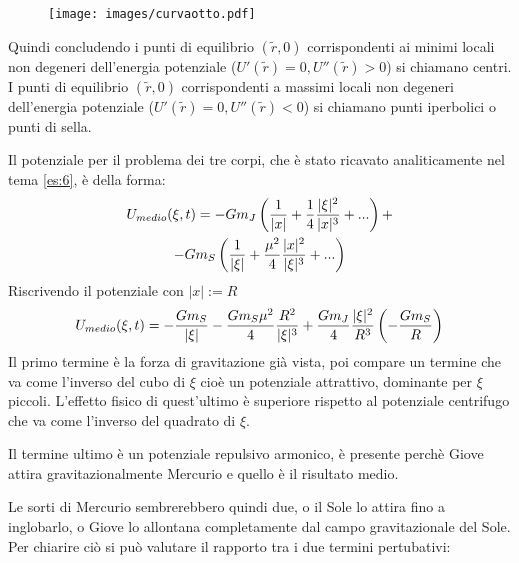 \documentclass[Main.tex]{subfiles}
\begin{document}
\begin{figure}[H]
    \centering
    \texttt{[image: images/curvaotto.pdf]}
\end{figure}

Quindi concludendo i punti di equilibrio $(\tilde r ,0)$ corrispondenti ai minimi locali non degeneri dell'energia potenziale ($U'( \tilde r) = 0 , U'' (\tilde r) >0$) si chiamano centri.
\\ I punti di equilibrio $(\tilde r ,0)$ corrispondenti a massimi locali non degeneri dell'energia potenziale ($U'(\tilde r)=0, U''(\tilde r) <0$) si chiamano punti iperbolici o punti di sella.

\newpage
\begin{tema} 
Il potenziale per il problema dei tre corpi, che è stato ricavato analiticamente nel tema \ref{es:6}, è della forma:
\begin{gather} \notag
	U_{medio} ( \xi, t) = - Gm_J \left( \frac{1}{|x|} + \frac{1}{4} \frac{|\xi|^2}{|x|^3} + ... \right)+ \\-Gm_S \left( \frac{1}{|\xi|} + \frac{\mu^2}{4} \frac{|x|^2}{|\xi|^3} +...\right) \notag
\end{gather}
Riscrivendo il potenziale con $|x|:=R$
\begin{equation}\notag
	U_{medio} (\xi,t)=- \frac{Gm_S}{|\xi|} - \frac{Gm_S \mu^2}{4} \frac{R^2}{|\xi|^3} + \frac{G m_J }{4} \frac{|\xi|^2}{R^3} \left( -\frac{Gm_S}{R} \right)
\end{equation}
Il primo termine è la forza di gravitazione già vista, poi compare un termine che va come l'inverso del cubo di $\xi$ cioè un potenziale attrattivo, dominante per $\xi$ piccoli. L'effetto fisico di quest'ultimo è superiore rispetto al potenziale centrifugo che va come l'inverso del quadrato di $\xi$. 

Il termine ultimo è un potenziale repulsivo armonico, è presente perchè Giove attira gravitazionalmente Mercurio e quello è il risultato medio.	

\begin{osservazione}
	Le sorti di Mercurio sembrerebbero quindi due, o il Sole lo attira fino a inglobarlo, o Giove lo allontana completamente dal campo gravitazionale del Sole. Per chiarire ciò si può valutare il rapporto tra i due termini pertubativi:


\end{osservazione}
\end{tema}
\end{document}
